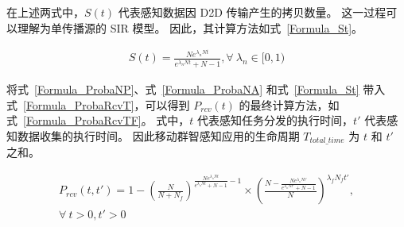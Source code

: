 在上述两式中，$S(t)$ 代表感知数据因 D2D 传输产生的拷贝数量。
这一过程可以理解为单传播源的 SIR 模型。
因此，其计算方法如式~\eqref{Formula_St}。

\begin{equation}
\label{Formula_St}
  \begin{aligned}
    S(t) = \frac{N e^{\lambda_n N t}}{e^{\lambda_n N t} + N -1}, \forall \ \lambda_n \in [0,1)
  \end{aligned}
\end{equation}

将式~\eqref{Formula_ProbaNP}、式~\eqref{Formula_ProbaNA} 和式~\eqref{Formula_St} 带入式~\eqref{Formula_ProbaRcvT}，可以得到 $P_{rcv}(t)$ 的最终计算方法，如式~\eqref{Formula_ProbaRcvTF}。
式中，$t$ 代表感知任务分发的执行时间，$t'$ 代表感知数据收集的执行时间。
因此移动群智感知应用的生命周期 $T_{total\_time}$ 为 $t$ 和 $t'$ 之和。

\begin{equation}
  \label{Formula_ProbaRcvTF}
  \begin{gathered}
    P_{rcv}(t, t') = 1 -  (\frac{N}{N + N_f})^{\frac{N e^{\lambda_n N t}}{e^{\lambda_n N t} + N -1} - 1} \times (\frac{N-\frac{N e^{\lambda_n N t'}}{e^{\lambda_n N t'} + N -1}}{N})^{\lambda_f N_f t'}, \\
    \forall \  t > 0, t' >0
  \end{gathered}
\end{equation}




